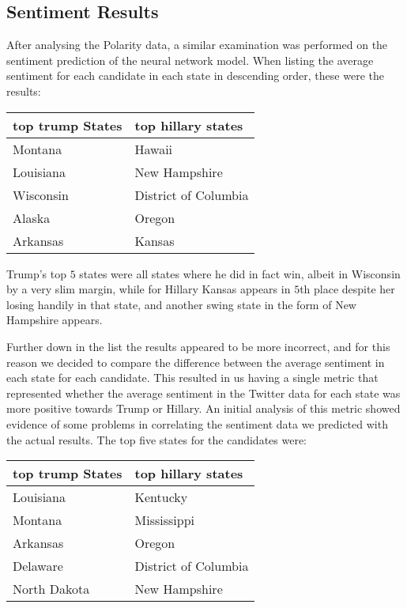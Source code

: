 \documentclass{article}
\begin{document}
  \subsection{Sentiment Results}
  After analysing the Polarity data, a similar examination was
  performed on the sentiment prediction of the neural network
  model. When listing the average sentiment for each candidate in each
  state in descending order, these were the results: 

  \begin{table}[H]
    \centering
    \begin{tabular}{||p{3cm} p{3.5cm}||}
      \hline
      top trump States & top hillary states \\ \hline
      Montana & Hawaii \\
      Louisiana & New Hampshire \\
      Wisconsin & District of Columbia \\
      Alaska & Oregon \\
      Arkansas & Kansas \\
      \hline
    \end{tabular}
  \end{table}

  Trump’s top $5$ states were all states where he did in fact win,
  albeit in Wisconsin by a very slim margin, while for Hillary Kansas
  appears in $5$th place despite her losing handily in that state, and
  another swing state in the form of New Hampshire appears.

  Further down in the list the results appeared to be more incorrect,
  and for this reason we decided to compare the difference between the
  average sentiment in each state for each candidate. This resulted in
  us having a single metric that represented whether the average
  sentiment in the Twitter data for each state was more positive
  towards Trump or Hillary. An initial analysis of this metric showed
  evidence of some problems in correlating the sentiment data we
  predicted with the actual results. The top five states for the
  candidates were: 
  
  \begin{table}[H]
    \centering
    \begin{tabular}{||p{3cm} p{3.5cm}||}
      \hline
      top trump States & top hillary states \\ \hline
      Louisiana & Kentucky \\
      Montana & Mississippi \\
      Arkansas & Oregon \\
      Delaware & District of Columbia \\
      North Dakota & New Hampshire \\
      \hline
    \end{tabular}
  \end{table}
\end{document}
